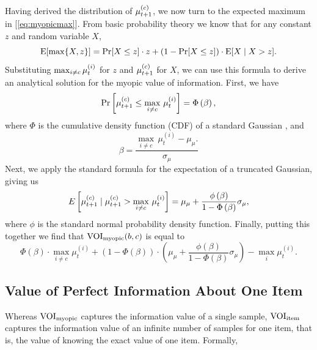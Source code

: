 Having derived the distribution of $\mu_{t+1}^{(c)}$, we now turn to the expected maximum in [\ref{eq:myopicmax}]. From basic probability theory we know that for any constant $z$ and random variable $X$,
%
\begin{equation}
  \label{eq:emaxtrick}
  \operatorname*{E}[\max\{X,z\}] = 
    \Pr[X\le z]\cdot z+
    (1-\Pr[X\le z]) 
    \cdot \operatorname*{E}[X\mid X>z].
\end{equation}
%
%
Substituting $\max_{i \neq c} \mu_t^{(i)}$ for $z$ and $\mu_{t+1}^{(c)}$ for $X$, we can use this formula to derive an analytical solution for the myopic value of information. First, we have
%
\begin{equation}
  \Pr\left[\mu_{t+1}^{(c)}\le \max_{i\neq c}\,\mu_t^{(i)}\right]=\Phi\left(\beta\right),
\end{equation}
%
where $\Phi$ is the cumulative density function (CDF) of a standard Gaussian , and 
%
\begin{equation}
  \beta=\frac{\max_{i\neq c}\,\mu_t^{(i)}-\mu_{\mu}.}{\sigma_{\mu}}
\end{equation}
%
Next, we apply the standard formula for the expectation of a truncated Gaussian, giving us
%
\begin{equation}
  E\left[\mu_{t+1}^{(c)}\mid\mu_{t+1}^{(c)}>\max_{i\neq c}\,\mu_t^{(i)}\right]=\mu_{\mu}+\frac{\phi\left(\beta\right)}{1-\Phi\left(\beta\right)}\sigma_{\mu},
\end{equation}
%
where $\phi$ is the standard normal probability density function.
Finally, putting this together we find that $\text{VOI}_\text{myopic}(b,c)$ is equal to
%
\begin{equation}
  \Phi(\beta)\cdot\max_{i\neq c}\mu_t^{(i)}+\left(1-\Phi(\beta)\right)\cdot\left(\mu_{\mu}+\frac{\phi\left(\beta\right)}{1-\Phi\left(\beta\right)}\sigma_{\mu}\right)-\max_{i}\mu_t^{(i)}.
\end{equation}


\subsection{Value of Perfect Information About One Item}
Whereas $\text{VOI}_\text{myopic}$ captures the information value of a single sample, $\text{VOI}_\text{item}$ captures the information value of an infinite number of samples for one item, that is, the value of knowing the exact value of one item. Formally,

